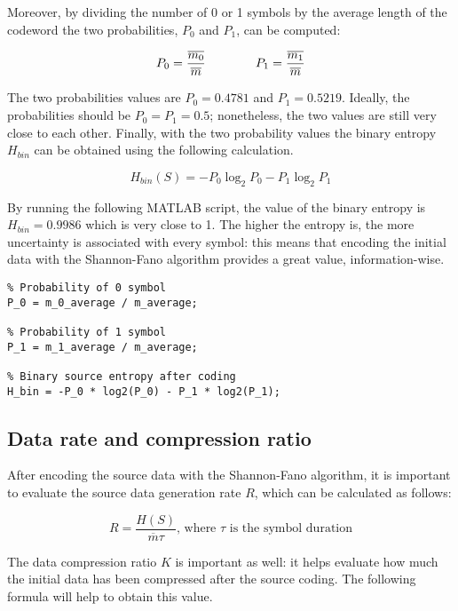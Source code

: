 \noindent Moreover, by dividing the number of 0 or 1 symbols by the average length of the codeword the two probabilities, $P_0$ and $P_1$, can be computed:

\begin{equation*}
    P_0 = \frac{\overline{m_0}}{\overline{m}}
    \hspace*{40px}
    P_1 = \frac{\overline{m_1}}{\overline{m}}
\end{equation*}

\noindent The two probabilities values are $P_0 = 0.4781$ and $P_1 = 0.5219$. Ideally, the probabilities should be $P_0 = P_1 = 0.5$; nonetheless, the two values are still very close to each other. Finally, with the two probability values the binary entropy $H_{bin}$ can be obtained using the following calculation.

\begin{equation*}
    H_{bin}(S) = - P_0\log_2P_0 - P_1\log_2P_1
\end{equation*}

\noindent By running the following MATLAB script, the value of the binary entropy is $H_{bin} = 0.9986$ which is very close to 1. The higher the entropy is, the more uncertainty is associated with every symbol: this means that encoding the initial data with the Shannon-Fano algorithm provides a great value, information-wise.

\begin{lstlisting}
% Probability of 0 symbol
P_0 = m_0_average / m_average; 

% Probability of 1 symbol
P_1 = m_1_average / m_average; 

% Binary source entropy after coding
H_bin = -P_0 * log2(P_0) - P_1 * log2(P_1); 
\end{lstlisting}


\subsection{Data rate and compression ratio}
After encoding the source data with the Shannon-Fano algorithm, it is important to evaluate the source data generation rate $R$, which can be calculated as follows:

\begin{equation*}
    R = \frac{H(S)}{\overline{m}\tau}\text{, where $\tau$ is the symbol duration}
\end{equation*}
 
\noindent The data compression ratio $K$ is important as well: it helps evaluate how much the initial data has been compressed after the source coding. The following formula will help to obtain this value.

